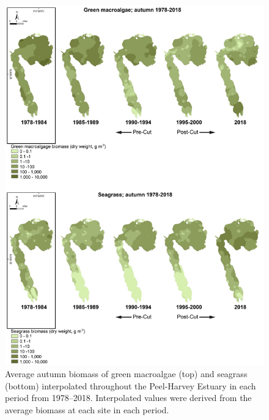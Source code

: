 \documentclass[
]{book}
\begin{document}
\begin{figure}
\includegraphics[width=1\linewidth]{images/macrophytes/picture8} \caption{Average autumn biomass of green macroalgae (top) and seagrass (bottom) interpolated throughout the Peel-Harvey Estuary in each period from 1978–2018. Interpolated values were derived from the average biomass at each site in each period.}\label{fig:macrophytes-pic8}
\end{figure}
\end{document}
